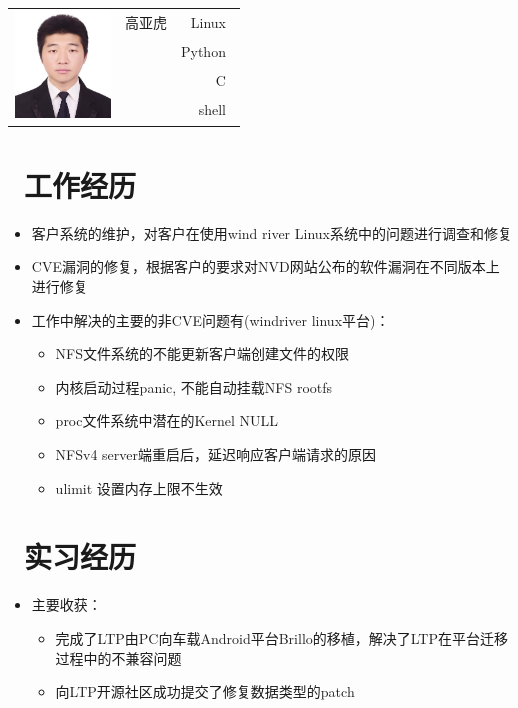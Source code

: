 \documentclass{resume}
\begin{document}
\Large{
  \begin{tabu}{ c l r }
     & \scshape{高亚虎} & {Linux~} \\
    &  & {Python~} \\
    &  & {C~} \\
    &  & {shell~}
  \end{tabu}
}

\section{\faUsers\ 工作经历}\normalsize
{}
\begin{itemize}
    \item {客户系统的维护，对客户在使用wind river Linux系统中的问题进行调查和修复}    
	\item {CVE漏洞的修复，根据客户的要求对NVD网站公布的软件漏洞在不同版本上进行修复}
    \item {工作中解决的主要的非CVE问题有(windriver linux平台)：}
    \begin{itemize}
        \item {NFS文件系统的不能更新客户端创建文件的权限}
        \item {内核启动过程panic, 不能自动挂载NFS rootfs}
        \item {proc文件系统中潜在的Kernel NULL}
        \item {NFSv4 server端重启后，延迟响应客户端请求的原因}
        \item {ulimit 设置内存上限不生效}
    \end{itemize}
\end{itemize}

\section{\faUsers\ 实习经历}\normalsize
{}
\begin{itemize}
    \item {主要收获：}
    \begin{itemize}
        \item {完成了LTP由PC向车载Android平台Brillo的移植，解决了LTP在平台迁移过程中的不兼容问题}
        \item {向LTP开源社区成功提交了修复数据类型的patch}
    \end{itemize}
\end{itemize}
\end{document}

